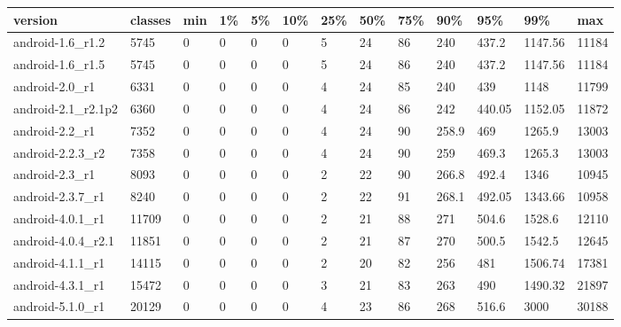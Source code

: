\begin{tabular}{|l|l|l|l|l|l|l|l|l|l|l|l|l|}
\hline
version&classes&min&1\%&5\%&10\%&25\%&50\%&75\%&90\%&95\%&99\%&max\\
\hline
android-1.6\_r1.2&5745&0&0&0&0&5&24&86&240&437.2&1147.56&11184\\
\hline
android-1.6\_r1.5&5745&0&0&0&0&5&24&86&240&437.2&1147.56&11184\\
\hline
android-2.0\_r1&6331&0&0&0&0&4&24&85&240&439&1148&11799\\
\hline
android-2.1\_r2.1p2&6360&0&0&0&0&4&24&86&242&440.05&1152.05&11872\\
\hline
android-2.2\_r1&7352&0&0&0&0&4&24&90&258.9&469&1265.9&13003\\
\hline
android-2.2.3\_r2&7358&0&0&0&0&4&24&90&259&469.3&1265.3&13003\\
\hline
android-2.3\_r1&8093&0&0&0&0&2&22&90&266.8&492.4&1346&10945\\
\hline
android-2.3.7\_r1&8240&0&0&0&0&2&22&91&268.1&492.05&1343.66&10958\\
\hline
android-4.0.1\_r1&11709&0&0&0&0&2&21&88&271&504.6&1528.6&12110\\
\hline
android-4.0.4\_r2.1&11851&0&0&0&0&2&21&87&270&500.5&1542.5&12645\\
\hline
android-4.1.1\_r1&14115&0&0&0&0&2&20&82&256&481&1506.74&17381\\
\hline
android-4.3.1\_r1&15472&0&0&0&0&3&21&83&263&490&1490.32&21897\\
\hline
android-5.1.0\_r1&20129&0&0&0&0&4&23&86&268&516.6&3000&30188\\
\hline
\end{tabular}
